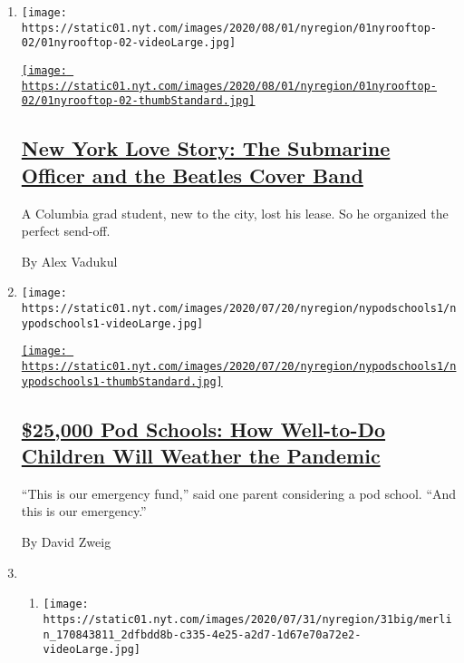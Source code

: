 \begin{enumerate}
\def\labelenumi{\arabic{enumi}.}
\item
  \texttt{[image: https://static01.nyt.com/images/2020/08/01/nyregion/01nyrooftop-02/01nyrooftop-02-videoLarge.jpg]}

  \href{/2020/07/30/nyregion/coronavirus-beatles-nyc.html}{\texttt{[image: https://static01.nyt.com/images/2020/08/01/nyregion/01nyrooftop-02/01nyrooftop-02-thumbStandard.jpg]}}

  \hypertarget{new-york-love-story-the-submarine-officer-and-the-beatles-cover-band}{%
  \subsection{\texorpdfstring{\href{/2020/07/30/nyregion/coronavirus-beatles-nyc.html}{New
  York Love Story: The Submarine Officer and the Beatles Cover
  Band}}{New York Love Story: The Submarine Officer and the Beatles Cover Band}}\label{new-york-love-story-the-submarine-officer-and-the-beatles-cover-band}}

  A Columbia grad student, new to the city, lost his lease. So he
  organized the perfect send-off.

  By Alex Vadukul
\item
  \texttt{[image: https://static01.nyt.com/images/2020/07/20/nyregion/nypodschools1/nypodschools1-videoLarge.jpg]}

  \href{/2020/07/30/nyregion/pod-schools-hastings-on-hudson.html}{\texttt{[image: https://static01.nyt.com/images/2020/07/20/nyregion/nypodschools1/nypodschools1-thumbStandard.jpg]}}

  \hypertarget{25000-pod-schools-how-well-to-do-children-will-weather-the-pandemic}{%
  \subsection{\texorpdfstring{\href{/2020/07/30/nyregion/pod-schools-hastings-on-hudson.html}{\$25,000
  Pod Schools: How Well-to-Do Children Will Weather the
  Pandemic}}{\$25,000 Pod Schools: How Well-to-Do Children Will Weather the Pandemic}}\label{25000-pod-schools-how-well-to-do-children-will-weather-the-pandemic}}

  ``This is our emergency fund,'' said one parent considering a pod
  school. ``And this is our emergency.''

  By David Zweig
\item
  \begin{enumerate}
  \def\labelenumii{\arabic{enumii}.}
  \item
    \texttt{[image: https://static01.nyt.com/images/2020/07/31/nyregion/31big/merlin\_170843811\_2dfbdd8b-c335-4e25-a2d7-1d67e70a72e2-videoLarge.jpg]}


\end{enumerate}
\end{enumerate}
